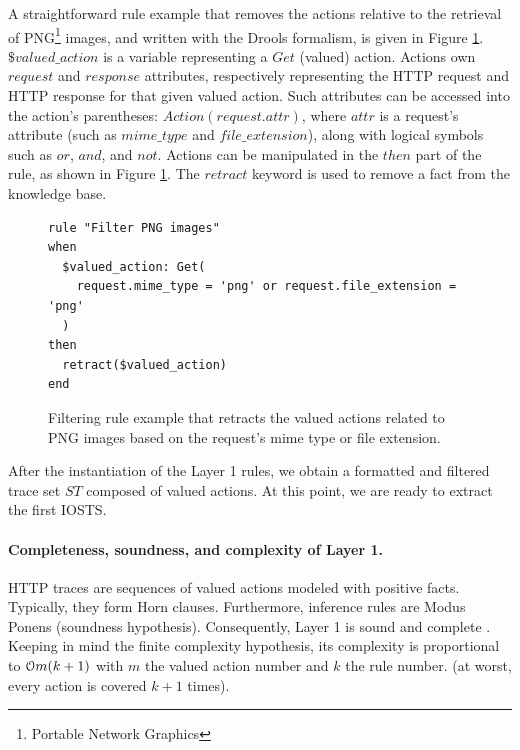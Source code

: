 A straightforward rule example that removes the actions relative
to the retrieval of PNG\footnote{Portable Network Graphics}
images, and written with the Drools formalism, is given in Figure
\ref{fig:layer1:filter}.  $\$valued\_action$ is a variable
representing a $Get$ (valued) action.  Actions own $request$ and
$response$ attributes, respectively representing the HTTP request
and HTTP response for that given valued action. Such attributes
can be accessed into the action's parentheses:
$Action(request.attr)$, where $attr$ is a request's attribute
(such as $mime\_type$ and $file\_extension$), along with logical
symbols such as $or$, $and$, and $not$. Actions can be
manipulated in the $then$ part of the rule, as shown in Figure
\ref{fig:layer1:filter}. The $retract$ keyword is used to remove
a fact from the knowledge base.

\begin{figure}[ht]
\begin{framed}
\begin{BVerbatim}
rule "Filter PNG images"
when
  $valued_action: Get(
    request.mime_type = 'png' or request.file_extension = 'png'
  )
then
  retract($valued_action)
end
\end{BVerbatim}
\end{framed}

    \caption{Filtering rule example that retracts the valued actions
    related to PNG images based on the request's mime type or
    file extension.}
    \label{fig:layer1:filter}
\end{figure}

After the instantiation of the Layer 1 rules, we obtain a
formatted and filtered trace set $ST$ composed of valued actions.
At this point, we are ready to extract the first IOSTS.

\paragraph{Completeness, soundness, and complexity of Layer 1.}

HTTP traces are sequences of valued actions modeled with
positive facts. Typically, they form Horn clauses. Furthermore,
inference rules are Modus Ponens (soundness hypothesis).
Consequently, Layer 1 is sound and complete \cite{logicreasoning}.
Keeping in mind the finite complexity hypothesis, its complexity
is proportional to $\EuScript{O}m(k+1)$ with $m$ the valued
action number and $k$ the rule number. (at worst, every action is
covered $k+1$ times).


